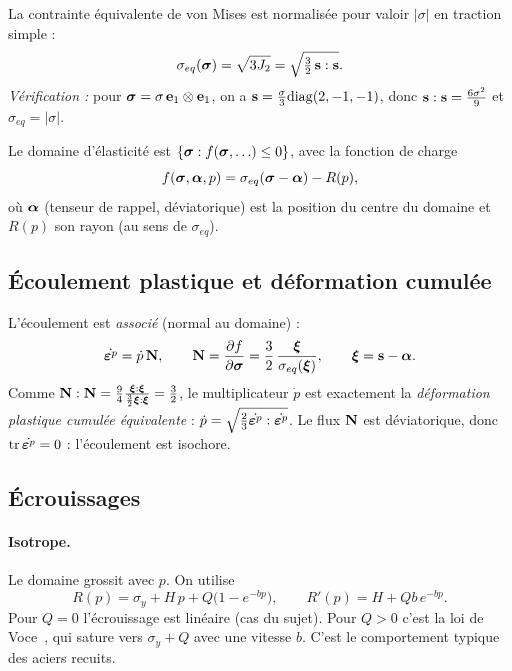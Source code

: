 La contrainte équivalente de von Mises est normalisée pour valoir $|\sigma|$ en traction simple :
\begin{equation}
\sigma_{eq}(\boldsymbol{\sigma}) = \sqrt{3J_2} = \sqrt{\tfrac32\,\mathbf{s}:\mathbf{s}}.
\end{equation}
\emph{Vérification :} pour $\boldsymbol{\sigma}=\sigma\,\mathbf{e}_1\otimes\mathbf{e}_1$, on a $\mathbf{s} = \frac{\sigma}{3}\mathrm{diag}(2,-1,-1)$, donc $\mathbf{s}:\mathbf{s}=\frac{6\sigma^2}{9}$ et $\sigma_{eq}=|\sigma|$.

Le domaine d'élasticité est $\{\boldsymbol{\sigma} : f(\boldsymbol{\sigma},\ldots)\le0\}$, avec la fonction de charge
\begin{equation}
f(\boldsymbol{\sigma},\boldsymbol{\alpha},p) = \sigma_{eq}(\boldsymbol{\sigma}-\boldsymbol{\alpha}) - R(p),
\label{eq:f}
\end{equation}
où $\boldsymbol{\alpha}$ (tenseur de rappel, déviatorique) est la position du centre du domaine et $R(p)$ son rayon (au sens de $\sigma_{eq}$).

\subsection{Écoulement plastique et déformation cumulée}

L'écoulement est \emph{associé} (normal au domaine) :
\begin{equation}
\dot{\boldsymbol{\varepsilon}^{p}} = \dot p\,\mathbf{N},\qquad \mathbf{N} = \frac{\partial f}{\partial\boldsymbol{\sigma}} = \frac32\,\frac{\boldsymbol{\xi}}{\sigma_{eq}(\boldsymbol{\xi})},\qquad \boldsymbol{\xi} = \mathbf{s}-\boldsymbol{\alpha} .
\label{eq:flow}
\end{equation}
Comme $\mathbf{N}:\mathbf{N}=\frac94\frac{\boldsymbol{\xi}:\boldsymbol{\xi}}{\frac32\boldsymbol{\xi}:\boldsymbol{\xi}}=\frac32$, le multiplicateur $\dot p$ est exactement la \emph{déformation plastique cumulée équivalente} : $\dot p = \sqrt{\tfrac23\dot{\boldsymbol{\varepsilon}^{p}}:\dot{\boldsymbol{\varepsilon}^{p}}}$. Le flux $\mathbf{N}$ est déviatorique, donc $\operatorname{tr}\dot{\boldsymbol{\varepsilon}^{p}}=0$ : l'écoulement est isochore.

\subsection{Écrouissages}

\paragraph{Isotrope.} Le domaine grossit avec $p$. On utilise
\begin{equation}
R(p) = \sigma_y + H\,p + Q\big(1-e^{-bp}\big),\qquad R'(p) = H + Qb\,e^{-bp}.
\end{equation}
Pour $Q=0$ l'écrouissage est linéaire (cas du sujet). Pour $Q>0$ c'est la loi de Voce~\cite{voce1948}, qui sature vers $\sigma_y+Q$ avec une vitesse $b$. C'est le comportement typique des aciers recuits.

